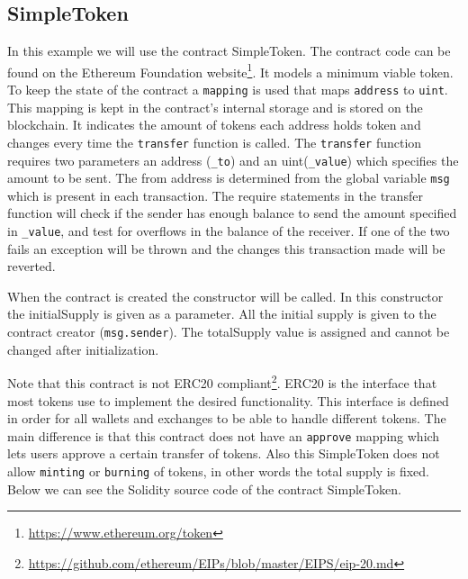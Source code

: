 \documentclass[a4paper]{article}
\begin{document}
\subsection{SimpleToken}
In this example we will use the contract SimpleToken. The contract code can be found on the Ethereum Foundation website\footnote{\url{https://www.ethereum.org/token}}. 
It models a minimum viable token. To keep the state of the contract a \texttt{mapping} is used that maps \texttt{address} to \texttt{uint}. This mapping is kept in the contract's internal storage and is stored on the blockchain. It indicates the amount of tokens each address holds token and changes every time the \texttt{transfer} function is called. The \texttt{transfer} function requires two parameters an address (\texttt{\_to})  and an uint(\texttt{\_value}) which specifies the amount to be sent. The from address is determined from the global variable \texttt{msg} which is present in each transaction. The require statements in the transfer function will check if the sender has enough balance to send the amount specified in \texttt{\_value}, and test for overflows in the balance of the receiver. If one of the two fails an exception will be thrown and the changes this transaction made will be reverted.\par
When the contract is created the constructor will be called. In this constructor the initialSupply is given as a parameter. All the initial supply is given to the contract creator (\texttt{msg.sender}). The totalSupply value is assigned and cannot be changed after initialization.\par
Note that this contract is not ERC20 compliant\footnote{\url{https://github.com/ethereum/EIPs/blob/master/EIPS/eip-20.md}}. ERC20 is the interface that most tokens use to implement the desired functionality. This interface is defined in order for all wallets and exchanges to be able to handle different tokens. The main difference is that this contract does not have an \texttt{approve} mapping which lets users approve a certain transfer of tokens. Also this SimpleToken does not allow \texttt{minting} or \texttt{burning} of tokens, in other words the total supply is fixed. Below we can see the Solidity source code of the contract SimpleToken.


\end{document}
